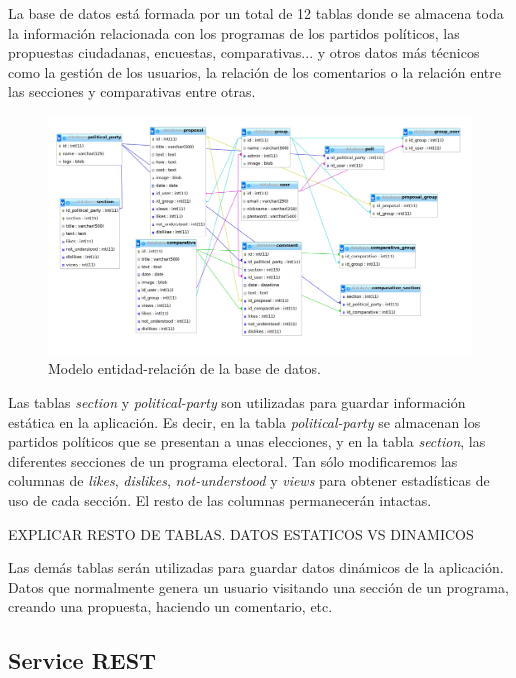 La base de datos está formada por un total de 12 tablas donde se almacena toda la información relacionada con los programas de los partidos políticos, las propuestas ciudadanas, encuestas, comparativas... y otros datos más técnicos como la gestión de los usuarios, la relación de los comentarios o la relación entre las secciones y comparativas entre otras.

\begin{figure}[H]
\centering
\includegraphics[keepaspectratio, scale=0.30]{Media/Captures/database.png}
\caption{Modelo entidad-relación de la base de datos.}
\label{fig:ermodel}
\end{figure}

Las tablas \textit{section} y \textit{political-party} son utilizadas para guardar información estática en la aplicación. Es decir, en la tabla \textit{political-party} se almacenan los partidos políticos que se presentan a unas elecciones, y en la tabla \textit{section}, las diferentes secciones de un programa electoral. Tan sólo modificaremos las columnas de \textit{likes}, \textit{dislikes}, \textit{not-understood} y \textit{views} para obtener estadísticas de uso de cada sección. El resto de las columnas permanecerán intactas.

EXPLICAR RESTO DE TABLAS. DATOS ESTATICOS VS DINAMICOS

Las demás tablas serán utilizadas para guardar datos dinámicos de la aplicación. Datos que normalmente genera un usuario visitando una sección de un programa, creando una propuesta, haciendo un comentario, etc.

\subsection{Service REST}

